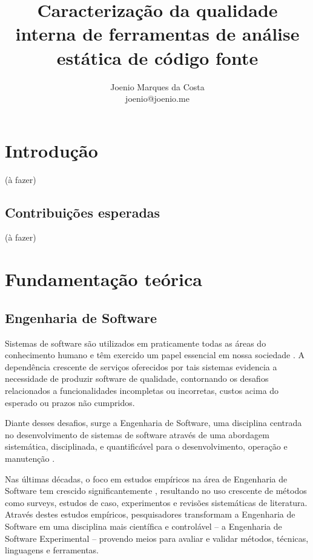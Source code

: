 \documentclass[qual, classic, a4paper]{ufbathesis}
\title{
  Caracterização da qualidade interna de ferramentas de análise estática de
  código fonte
}
\author{Joenio Marques da Costa\\
  {\small joenio@joenio.me}
}
\begin{document}
\frontpage
\frontmatter
\presentationpage

%
%
%
%

\tableofcontents
\listoffigures
\listoftables
\mainmatter

\chapter{Introdução}

(à fazer)

\section{Contribuições esperadas}

(à fazer)

\chapter{Fundamentação teórica}

\section{Engenharia de Software}

Sistemas de software são utilizados em praticamente todas as áreas do
conhecimento humano e têm exercido um papel essencial em nossa sociedade
\cite{Mafra2006}. A dependência crescente de serviços oferecidos por tais
sistemas evidencia a necessidade de produzir software de qualidade,
contornando os  desafios relacionados a funcionalidades incompletas ou
incorretas, custos acima do esperado ou prazos não cumpridos.

Diante desses desafios, surge a Engenharia de Software, uma disciplina
centrada no desenvolvimento de sistemas de software através
de uma abordagem sistemática, disciplinada, e quantificável para o
desenvolvimento, operação e manutenção \cite{SWEBOK2014}.

Nas últimas décadas, o foco em estudos empíricos na área de Engenharia de
Software tem crescido significantemente \cite{Stol2015}, resultando no uso
crescente de métodos como surveys, estudos de caso, experimentos e revisões
sistemáticas de literatura. Através destes estudos empíricos, pesquisadores
transformam a Engenharia de Software em uma disciplina mais científica e
controlável -- a  Engenharia de Software Experimental -- provendo meios para
avaliar e validar métodos, técnicas, linguagens e ferramentas.
\end{document}
